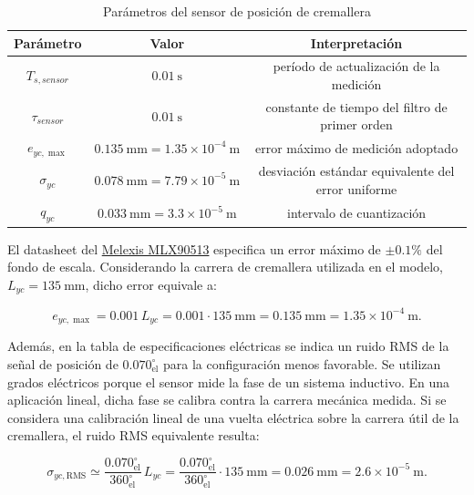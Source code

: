 \documentclass{article}
\begin{document}
\begin{table}[H]
\small
\centering
\caption{Parámetros del sensor de posición de cremallera}
\label{tab:parametros_sensor}
\begin{tabular}{c c c}
\toprule
\textbf{Parámetro} & \textbf{Valor} & \textbf{Interpretación} \\
\midrule
$T_{s,sensor}$ & $0.01\ \mathrm{s}$ & período de actualización de la medición \\
$\tau_{sensor}$ & $0.01\ \mathrm{s}$ & constante de tiempo del filtro de primer orden \\
$e_{yc,\max}$ & $0.135\ \mathrm{mm}=1.35\times10^{-4}\ \mathrm{m}$ & error máximo de medición adoptado \\
$\sigma_{yc}$ & $0.078\ \mathrm{mm}=7.79\times10^{-5}\ \mathrm{m}$ & desviación estándar equivalente del error uniforme \\
$q_{yc}$ & $0.033\ \mathrm{mm}=3.3\times10^{-5}\ \mathrm{m}$ & intervalo de cuantización \\
\bottomrule
\end{tabular}
\end{table}

El datasheet del \hyperlink{ref:mlx90513}{Melexis MLX90513} especifica un error máximo de $\pm 0.1\%$ del fondo de escala. Considerando la carrera de cremallera utilizada en el modelo, $L_{yc}=135\ \mathrm{mm}$, dicho error equivale a:

\begin{equation}
e_{yc,\max}=0.001\,L_{yc}=0.001\cdot135\ \mathrm{mm}
=0.135\ \mathrm{mm}=1.35\times10^{-4}\ \mathrm{m}.
\end{equation}

Además, en la tabla de especificaciones eléctricas se indica un ruido RMS de la señal de posición de $0.070^\circ_{\mathrm{el}}$ para la configuración menos favorable. Se utilizan grados eléctricos porque el sensor mide la fase de un sistema inductivo. En una aplicación lineal, dicha fase se calibra contra la carrera mecánica medida. Si se considera una calibración lineal de una vuelta eléctrica sobre la carrera útil de la cremallera, el ruido RMS equivalente resulta:

\begin{equation}
\sigma_{yc,\mathrm{RMS}}\simeq
\frac{0.070^\circ_{\mathrm{el}}}{360^\circ_{\mathrm{el}}}\,L_{yc}
=
\frac{0.070^\circ_{\mathrm{el}}}{360^\circ_{\mathrm{el}}}\cdot135\ \mathrm{mm}
=0.026\ \mathrm{mm}=2.6\times10^{-5}\ \mathrm{m}.
\end{equation}
\end{document}
